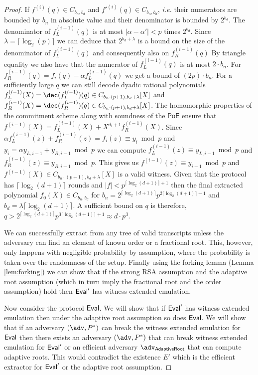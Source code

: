 \documentclass{article}
\theoremstyle{definition}
\begin{document}
\begin{proof}
 If $f^{(i)}(q)\in C_{b_n,b_d}$ and $f'^{(i)}(q)\in C_{b_n,b_d}$, \emph{i.e.} their numerators are bounded by $b_n$ in absolute value and their denominator is bounded by $2^{b_d}$. The denominator of $f^{(i-1)}_L(q)$ is at most $|\alpha-\alpha'|<p$ times $2^{b_d}$. Since $\lambda=\lceil\log_2(p)\rceil$ we can deduce that $2^{b_d+\lambda}$ is a bound on the size of the denominator of $f^{(i-1)}_L(q)$ and consequently also on $f^{(i-1)}_R(q)$
By triangle equality we also have that the numerator of $f^{(i-1)}_L(q)$ is at most $2\cdot b_n$. For $f^{(i-1)}_R(q)=f_{i}(q)-\alpha f^{(i-1)}_L(q)$ we get a bound of $(2 p )\cdot  b_n$. 
For a sufficiently large $q$ we can still decode dyadic rational polynomials $f^{(i-1)}_L(X)=\dec(f^{(i-1)}_L)(q) \in C_{b_n\cdot (p+1),b_d+\lambda}[X]$ and $f^{(i-1)}_R(X)=\dec(f^{(i-1)}_R)(q) \in C_{b_n\cdot (p+1),b_d+\lambda}[X]$. 
The homomorphic properties of the commitment scheme along with soundness of the $\textsf{PoE}$ ensure that $f^{(i-1)}(X)=f^{(i-1)}_L(X)+X^{d_{i}+1} f^{(i-1)}_R(X)$. 
Since $ \alpha f^{(i-1)}_L(z)+ f^{(i-1)}_R(z)=f_{i}(z) \equiv y_i \bmod p$ and $ y_i=\alpha y_{L,i-1}+  y_{R,i-1} \bmod p$ we can compute $f^{(i-1)}_L(z)\equiv y_{L,i-1}\bmod p$ and $f^{(i-1)}_R(z)\equiv y_{R,i-1}\bmod p$. This gives us $f^{(i-1)}(z)\equiv y_{i-1}\bmod p$ and $f^{(i-1)}(X)\in C_{b_n\cdot (p+1),b_d+\lambda}[X] $ is a valid witness.  
Given that the protocol has $\lceil \log_2(d+1)\rceil$ rounds and $|f|< p^{\lceil\log_2(d+1)\rceil+1}$ then the final extracted polynomial $f_0(X)\in C_{b_n,b_d}$ for $b_n=2^{\lceil\log_2(d+1)\rceil}p^{2 \lceil\log_2(d+1)\rceil+1}$ and $b_d=\lambda \lceil\log_2(d+1)\rceil$. A sufficient bound on $q$ is therefore, $q>2^{\lceil\log_2(d+1)\rceil}p^{3 \lceil\log_2(d+1)\rceil+1}\approx d \cdot p^3$.

We can successfully extract from any tree of valid transcripts unless the adversary can find an element of known order or a fractional root. This, however, only happens with negligible probability by assumption, where the probability is taken over the randomness of the setup. Finally using the forking lemma (Lemma \ref{lem:forking}) we can show that if the strong RSA assumption and the adaptive root assumption (which in turn imply the fractional root and the order assumption) hold then $\textsf{{Eval}}'$ has witness extended emulation.

Now consider the protocol $\textsf{{Eval}}$. We will show that if $\textsf{{Eval}}'$ has witness extended emulation then under the adaptive root assumption so does $\textsf{{Eval}}$.
We will show that if an adversary $(\adv,P^*)$ can break the witness extended emulation for $\textsf{{Eval}}$ then there exists an adversary $(\adv,P^*)$ that can break witness extended emulation for $\textsf{{Eval}}'$ or an efficient adversary $\adv_{\textsf{AdaptiveRoot}}$ that can compute adaptive roots. This would contradict the existence $E'$ which is the efficient extractor for $\textsf{{Eval}}'$ or the adaptive root assumption. 


\end{proof}
\end{document}
